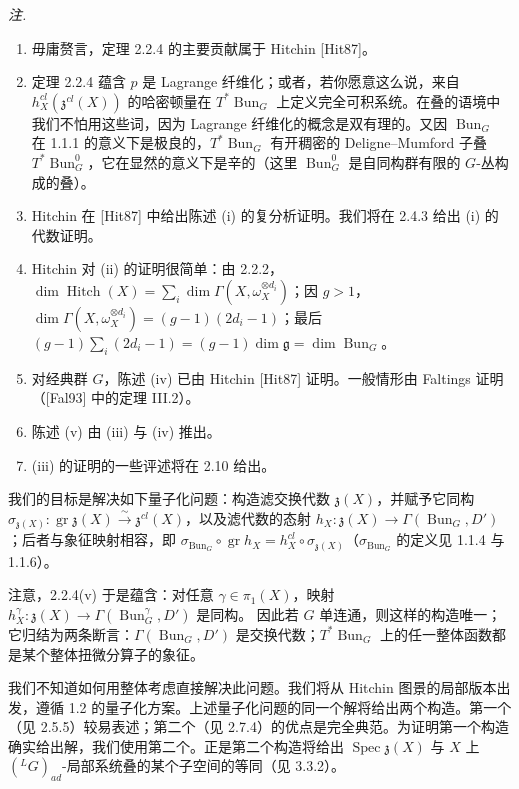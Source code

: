 \emph{注.}
\begin{enumerate}[label=(\roman*),leftmargin=2.6em]
\item 毋庸赘言，定理 2.2.4 的主要贡献属于 Hitchin [Hit87]。
\item 定理 2.2.4 蕴含 $p$ 是 Lagrange 纤维化；或者，若你愿意这么说，来自 $h_X^{cl}(\mathfrak{z}^{cl}(X))$ 的哈密顿量在 $T^{*}\operatorname{Bun}_G$ 上定义完全可积系统。在叠的语境中我们不怕用这些词，因为 Lagrange 纤维化的概念是双有理的。又因 $\operatorname{Bun}_G$ 在 1.1.1 的意义下是极良的，$T^{*}\operatorname{Bun}_G$ 有开稠密的 Deligne--Mumford 子叠 $T^{*}\operatorname{Bun}_G^{0}$，它在显然的意义下是辛的（这里 $\operatorname{Bun}_G^{0}$ 是自同构群有限的 $G$-丛构成的叠）。
\item Hitchin 在 [Hit87] 中给出陈述 (i) 的复分析证明。我们将在 2.4.3 给出 (i) 的代数证明。
\item Hitchin 对 (ii) 的证明很简单：由 2.2.2，$\dim\operatorname{Hitch}(X)=\sum_i\dim\Gamma(X,\omega_X^{\otimes d_i})$；因 $g>1$，$\dim\Gamma(X,\omega_X^{\otimes d_i})=(g-1)(2d_i-1)$；最后 $(g-1)\sum_i(2d_i-1)=(g-1)\dim\mathfrak{g}=\dim\operatorname{Bun}_G$。
\item 对经典群 $G$，陈述 (iv) 已由 Hitchin [Hit87] 证明。一般情形由 Faltings 证明（[Fal93] 中的定理 III.2）。
\item 陈述 (v) 由 (iii) 与 (iv) 推出。
\item (iii) 的证明的一些评述将在 2.10 给出。
\end{enumerate}

 我们的目标是解决如下量子化问题：构造滤交换代数 $\mathfrak{z}(X)$，并赋予它同构 $\sigma_{\mathfrak{z}(X)}:\operatorname{gr}\mathfrak{z}(X)\xrightarrow{\sim}\mathfrak{z}^{cl}(X)$，以及滤代数的态射 $h_X:\mathfrak{z}(X)\to\Gamma(\operatorname{Bun}_G,D')$；后者与象征映射相容，即 $\sigma_{\operatorname{Bun}_G}\circ\operatorname{gr}h_X=h_X^{cl}\circ\sigma_{\mathfrak{z}(X)}$（$\sigma_{\operatorname{Bun}_G}$ 的定义见 1.1.4 与 1.1.6）。

注意，2.2.4(v) 于是蕴含：对任意 $\gamma\in\pi_1(X)$，映射 $h_X^{\gamma}:\mathfrak{z}(X)\to\Gamma(\operatorname{Bun}_G^{\gamma},D')$ 是同构。
因此若 $G$ 单连通，则这样的构造唯一；它归结为两条断言：$\Gamma(\operatorname{Bun}_G,D')$ 是交换代数；$T^{*}\operatorname{Bun}_G$ 上的任一整体函数都是某个整体扭微分算子的象征。

我们不知道如何用整体考虑直接解决此问题。我们将从 Hitchin 图景的局部版本出发，遵循 1.2 的量子化方案。上述量子化问题的同一个解将给出两个构造。第一个（见 2.5.5）较易表述；第二个（见 2.7.4）的优点是完全典范。为证明第一个构造确实给出解，我们使用第二个。正是第二个构造将给出 $\operatorname{Spec}\mathfrak{z}(X)$ 与 $X$ 上 $(^{L}G)_{ad}$-局部系统叠的某个子空间的等同（见 3.3.2）。

